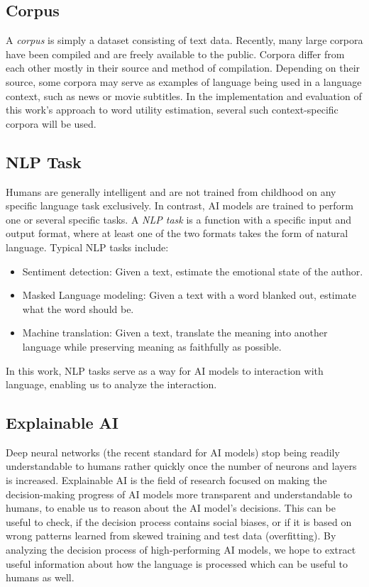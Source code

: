 	\subsection{Corpus}
	      A \textit{corpus} is simply a dataset consisting of text data.
	      Recently, many large corpora have been compiled and are freely available to the public.
	      Corpora differ from each other mostly in their source and method of compilation.
	      Depending on their source, some corpora may serve as examples of language being used in a language context, such as news or movie subtitles.
	      In the implementation and evaluation of this work's approach to word utility estimation, several such context-specific corpora will be used.

	\subsection{NLP Task}
	      Humans are generally intelligent and are not trained from childhood on any specific language task exclusively.
	      In contrast, AI models are trained to perform one or several specific tasks.
	      A \textit{NLP task} is a function with a specific input and output format, where at least one of the two formats takes the form of natural language.
	      Typical NLP tasks include:

	      \begin{itemize}
		      \item Sentiment detection: Given a text, estimate the emotional state of the author.
		      \item Masked Language modeling: Given a text with a word blanked out, estimate what the word should be.
		      \item Machine translation: Given a text, translate the meaning into another language while preserving meaning as faithfully as possible.
	      \end{itemize}

	      In this work, NLP tasks serve as a way for AI models to interaction with language, enabling us to analyze the interaction.

	\subsection{Explainable AI}
	      Deep neural networks (the recent standard for AI models) stop being readily understandable to humans rather quickly once the number of neurons and layers is increased.
	      Explainable AI is the field of research focused on making the decision-making progress of AI models more transparent and understandable to humans, to enable us to reason about the AI model's decisions. 
	      This can be useful to check, if the decision process contains social biases, or if it is based on wrong patterns learned from skewed training and test data (overfitting).
	      By analyzing the decision process of high-performing AI models, we hope to extract useful information about how the language is processed which can be useful to humans as well.

